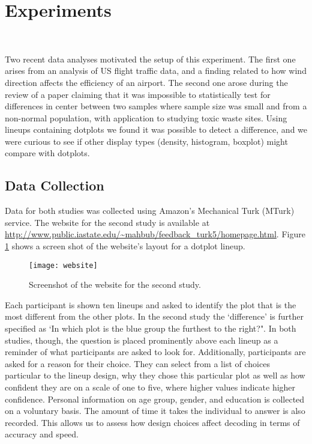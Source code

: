 \section{Experiments}~\label{setup}

Two recent data analyses motivated the setup of this experiment. The first one arises from an analysis of US flight traffic data, and a finding related to how wind direction affects the efficiency of an airport.  The second one arose during the review of a paper claiming that it was impossible to statistically test for differences in center between two samples where sample size was small and from a non-normal population, with application to studying toxic waste sites. Using lineups containing dotplots we found it was possible to detect a difference, and we were curious to see if other display types (density, histogram, boxplot) might compare with dotplots.


\subsection{Data Collection}
Data for both studies was collected using Amazon's Mechanical Turk (MTurk) service. 
The website for the second study is available at \url{http://www.public.iastate.edu/~mahbub/feedback_turk5/homepage.html}. Figure \ref{fig:screen} shows a screen shot of the website's layout for a dotplot lineup.

\begin{figure}[htbp] %
   \centering
   \texttt{[image: website]} 
\vspace{-.2in}
   \caption{Screenshot of the website for the second study. }
   \label{fig:screen}
\end{figure}

Each participant is shown ten lineups and asked to identify the plot that is the most different from the other plots. In the second study the `difference' is further specified as `In which plot is the blue group the furthest to the right?". 
 In both studies, though, the question is placed prominently above each lineup as a reminder of what participants are asked to look for.  Additionally, participants are asked for a reason for their choice. They can select from a list of choices particular to the lineup design, why they chose this particular plot as well as how confident they are on a scale of one to five, where higher values indicate higher confidence. Personal information on age group, gender, and education is collected on a voluntary basis.  The amount of time it takes the individual to answer is also recorded.  This  allows us to assess how design choices affect decoding \cite{cleveland:1994} in terms of accuracy and speed.
 
